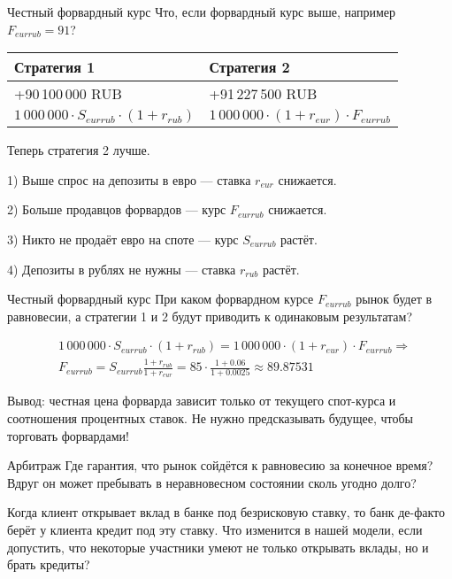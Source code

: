 \documentclass{beamer}
\begin{document}
\begin{frame}{Честный форвардный курс}
\justify
Что, если форвардный курс выше, например $F_{eurrub}=91$?


\justify
\centering
\begin{tabular}{l|l}
Стратегия 1 & Стратегия 2 \\ \hline
+90\,100\,000 RUB  & +91\,227\,500 RUB \\
$1\,000\,000 \cdot S_{eurrub} \cdot (1+r_{rub})$ & $1\,000\,000 \cdot (1+r_{eur}) \cdot F_{eurrub}$
\end{tabular}

\justify
Теперь стратегия 2 лучше. 

1) Выше спрос на депозиты в евро --- ставка $r_{eur}$ снижается.

2) Больше продавцов форвардов --- курс $F_{eurrub}$ снижается.

3) Никто не продаёт евро на споте --- курс $S_{eurrub}$ растёт. 

4) Депозиты в рублях не нужны --- ставка $r_{rub}$ растёт.
\end{frame}



\begin{frame}{Честный форвардный курс}
\justify
При каком форвардном курсе $F_{eurrub}$ рынок будет в равновесии, а стратегии 1 и 2 будут приводить к одинаковым результатам?

\begin{align*}
&1\,000\,000 \cdot S_{eurrub} \cdot (1 + r_{rub}) = 1\,000\,000 \cdot (1+r_{eur}) \cdot F_{eurrub} \Rightarrow \\
&F_{eurrub} = S_{eurrub} \frac{1 + r_{rub}}{1 + r_{eur}} = 85 \cdot \frac{1 + 0.06}{1 + 0.0025} \approx 89.87531
\end{align*}

\justify
Вывод: честная цена форварда зависит только от текущего спот-курса и соотношения процентных ставок. Не нужно предсказывать будущее, чтобы торговать форвардами!
\end{frame}



\begin{frame}{Арбитраж}
\justify
Где гарантия, что рынок сойдётся к равновесию за конечное время? Вдруг он может пребывать в неравновесном состоянии сколь угодно долго?

\justify
Когда клиент открывает вклад в банке под безрисковую ставку, то банк де-факто берёт у клиента кредит под эту ставку. Что изменится в нашей модели, если допустить, что некоторые участники умеют не только открывать вклады, но и брать кредиты?
\end{frame}
\end{document}
